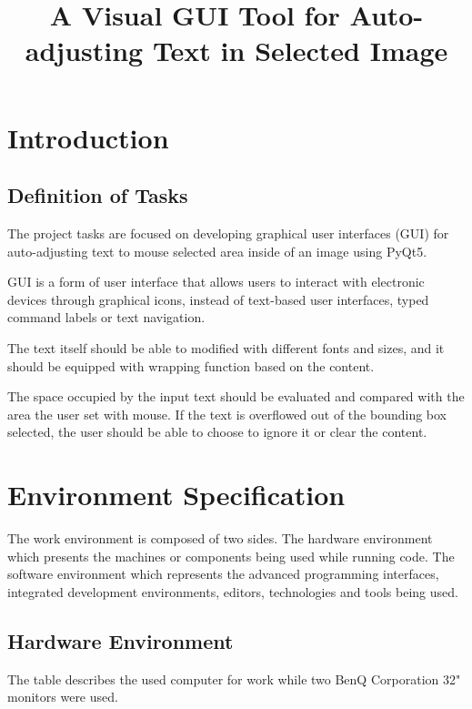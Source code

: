 \documentclass[a4paper, twoside]{report}
\title{A Visual GUI Tool for Auto-adjusting Text in Selected Image}
\begin{document}


\newpage
\tableofcontents
\newpage

\chapter{Introduction}
\section{Definition of Tasks}
\noindent The project tasks are focused on developing graphical user interfaces (GUI) for auto-adjusting text to mouse selected area inside of an image using PyQt5.  \\ \par

\noindent GUI is a form of user interface that allows users to interact with electronic devices through graphical icons, instead of text-based user interfaces, typed command labels or text navigation.  \\ \par

\noindent The text itself should be able to modified with different fonts and sizes, and it should be equipped with wrapping function based on the content.
 \\ \par
 
\noindent The space occupied by the input text should be evaluated and compared with the area the user set with mouse. If the text is overflowed out of the bounding box selected, the user should be able to choose to ignore it or clear the content.  \\ \par


\chapter{Environment Specification}
\noindent The work environment is composed of two sides. The hardware environment which presents the machines or components being used while running code. The software environment which represents the advanced programming interfaces, integrated development environments, editors, technologies and tools being used.  \\ \par

\section{Hardware Environment}
\noindent The table describes the used computer for work while two BenQ Corporation 32" monitors were used. \\ \par
\end{document}

